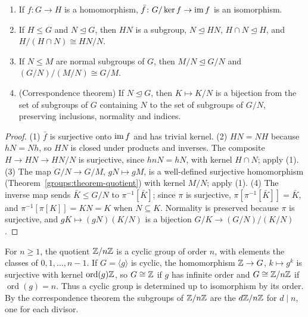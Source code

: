 \begin{theorem}\label{groups:theorem-isomorphism-theorems}
\begin{enumerate}
\item If $f \colon G \to H$ is a homomorphism, $\bar f \colon G/\ker f \to \operatorname{im} f$ is an
isomorphism.
\item If $H \leq G$ and $N \trianglelefteq G$, then $HN$ is a subgroup, $N \trianglelefteq HN$,
$H \cap N \trianglelefteq H$, and $H/(H \cap N) \cong HN/N$.
\item If $N \leq M$ are normal subgroups of $G$, then $M/N \trianglelefteq G/N$ and
$(G/N)/(M/N) \cong G/M$.
\item (Correspondence theorem) If $N \trianglelefteq G$, then $K \mapsto K/N$ is a bijection
from the set of subgroups of $G$ containing $N$ to the set of subgroups of $G/N$,
preserving inclusions, normality and indices.
\end{enumerate}
\end{theorem}

\begin{proof}
(1) $\bar f$ is surjective onto $\operatorname{im} f$ and has trivial kernel.
(2) $HN = NH$ because $hN = Nh$, so $HN$ is closed under products and inverses.
The composite $H \to HN \to HN/N$ is surjective, since $hnN = hN$, with kernel
$H \cap N$; apply (1).
(3) The map $G/N \to G/M$, $gN \mapsto gM$, is a well-defined surjective homomorphism
(Theorem~\ref{groups:theorem-quotient}) with kernel $M/N$; apply (1).
(4) The inverse map sends $\bar K \leq G/N$ to $\pi^{-1}[\bar K]$; since $\pi$ is
surjective, $\pi[\pi^{-1}[\bar K]] = \bar K$, and $\pi^{-1}[\pi[K]] = KN = K$ when
$N \subseteq K$. Normality is preserved because $\pi$ is surjective, and
$gK \mapsto (gN)(K/N)$ is a bijection $G/K \to (G/N)/(K/N)$.
\end{proof}

\begin{example}\label{groups:example-cyclic-groups}
For $n \geq 1$, the quotient $\mathbb{Z}/n\mathbb{Z}$ is a cyclic group of order $n$, with
elements the classes of $0, 1, \ldots, n-1$. If $G = \langle g \rangle$ is cyclic, the
homomorphism $\mathbb{Z} \to G$, $k \mapsto g^k$ is surjective with kernel
$\operatorname{ord}(g)\mathbb{Z}$, so $G \cong \mathbb{Z}$ if $g$ has infinite order and
$G \cong \mathbb{Z}/n\mathbb{Z}$ if $\operatorname{ord}(g) = n$. Thus a cyclic group is determined
up to isomorphism by its order. By the correspondence theorem the subgroups of
$\mathbb{Z}/n\mathbb{Z}$ are the $d\mathbb{Z}/n\mathbb{Z}$ for $d \mid n$, one for each divisor.
\end{example}


